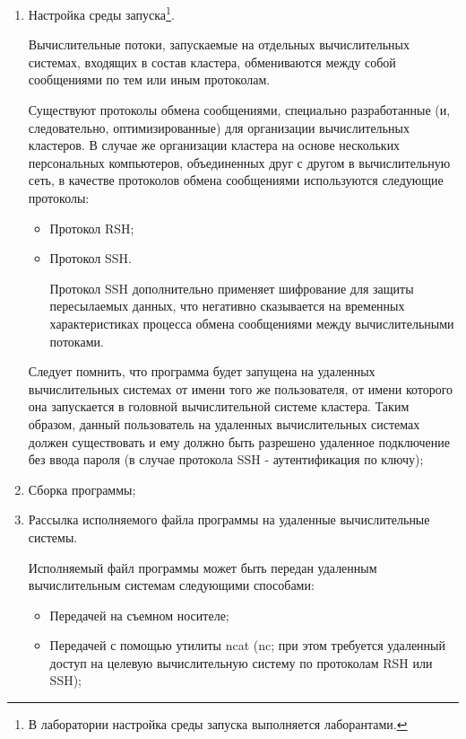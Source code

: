 \begin{enumerate}

	\item Настройка среды запуска\footnote{В лаборатории настройка среды запуска выполняется лаборантами.}.

	Вычислительные потоки, запускаемые на отдельных вычислительных системах, входящих в состав кластера, обмениваются между собой сообщениями по тем или иным протоколам.

	Существуют протоколы обмена сообщениями, специально разработанные (и, следовательно, оптимизированные) для организации вычислительных кластеров. В случае же организации кластера на основе нескольких персональных компьютеров, объединенных друг с другом в вычислительную сеть, в качестве протоколов обмена сообщениями используются следующие протоколы:

	\begin{itemize}

		\item Протокол RSH;
		
		\item Протокол SSH.

			Протокол SSH дополнительно применяет шифрование для защиты пересылаемых данных, что негативно сказывается на временных характеристиках процесса обмена сообщениями между вычислительными потоками.

	\end{itemize}

	Следует помнить, что программа будет запущена на удаленных вычислительных системах от имени того же пользователя, от имени которого она запускается в головной вычислительной системе кластера. Таким образом, данный пользователь на удаленных вычислительных системах должен существовать и ему должно быть разрешено удаленное подключение без ввода пароля (в случае протокола SSH - аутентификация по ключу);

	\item Сборка программы;

	\item Рассылка исполняемого файла программы на удаленные вычислительные системы.

	Исполняемый файл программы может быть передан удаленным вычислительным системам следующими способами:

	\begin{itemize}

		\item Передачей на съемном носителе;
		\item Передачей с помощью утилиты ncat (nc; при этом требуется удаленный доступ на целевую вычислительную систему по протоколам RSH или SSH);


\end{itemize}
\end{enumerate}
